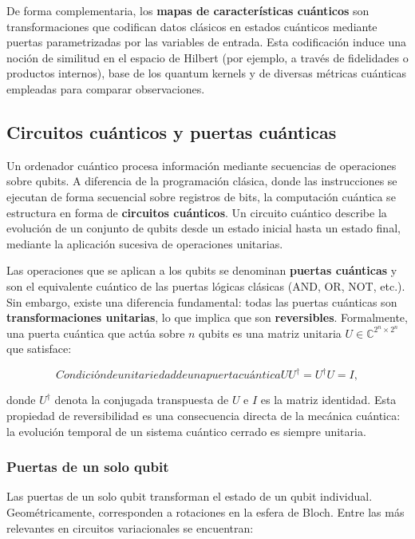 De forma complementaria, los \textbf{mapas de características cuánticos} son transformaciones que codifican datos clásicos en estados cuánticos mediante puertas parametrizadas por las variables de entrada. Esta codificación induce una noción de similitud en el espacio de Hilbert (por ejemplo, a través de fidelidades o productos internos), base de los quantum kernels y de diversas métricas cuánticas empleadas para comparar observaciones.

\subsection{Circuitos cuánticos y puertas cuánticas}
\label{ap:subsec:circuitos_puertas}

Un ordenador cuántico procesa información mediante secuencias de operaciones sobre qubits. A diferencia de la programación clásica, donde las instrucciones se ejecutan de forma secuencial sobre registros de bits, la computación cuántica se estructura en forma de \textbf{circuitos cuánticos}. Un circuito cuántico describe la evolución de un conjunto de qubits desde un estado inicial hasta un estado final, mediante la aplicación sucesiva de operaciones unitarias.

Las operaciones que se aplican a los qubits se denominan \textbf{puertas cuánticas} y son el equivalente cuántico de las puertas lógicas clásicas (AND, OR, NOT, etc.). Sin embargo, existe una diferencia fundamental: todas las puertas cuánticas son \textbf{transformaciones unitarias}, lo que implica que son \textbf{reversibles}. Formalmente, una puerta cuántica que actúa sobre $n$ qubits es una matriz unitaria $U \in \mathbb{C}^{2^n \times 2^n}$ que satisface:

\begin{equation}[ap:eq:unitaria]{Condición de unitariedad de una puerta cuántica}
U U^\dagger = U^\dagger U = I,
\end{equation}

donde $U^\dagger$ denota la conjugada transpuesta de $U$ e $I$ es la matriz identidad. Esta propiedad de reversibilidad es una consecuencia directa de la mecánica cuántica: la evolución temporal de un sistema cuántico cerrado es siempre unitaria.

\subsubsection{Puertas de un solo qubit}
\label{ap:subsubsec:puertasunqubit}

Las puertas de un solo qubit transforman el estado de un qubit individual. Geométricamente, corresponden a rotaciones en la esfera de Bloch. Entre las más relevantes en circuitos variacionales se encuentran:

